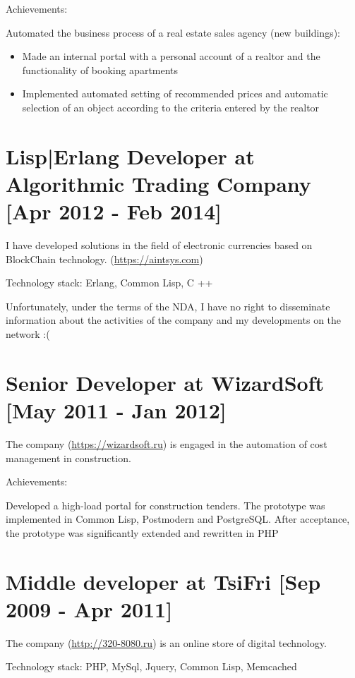 \documentclass[11pt]{article}
\begin{document}
Achievements:

Automated the business process of a real estate sales agency
(new buildings):
\begin{itemize}
\item Made an internal portal with a personal account of a
realtor and the functionality of booking apartments
\item Implemented automated setting of recommended prices and
automatic selection of an object according to the criteria
entered by the realtor
\end{itemize}


\section{\textbf{Lisp|Erlang Developer} at \textbf{Algorithmic Trading Company} [Apr 2012 - Feb 2014]}
\label{sec:org5ac2e60}

I have developed solutions in the field of electronic
currencies based on BlockChain technology. (\url{https://aintsys.com})

Technology stack: Erlang, Common Lisp, C ++

Unfortunately, under the terms of the NDA, I have no right
to disseminate information about the activities of the
company and my developments on the network :(

\section{\textbf{Senior Developer} at \textbf{WizardSoft} [May 2011 - Jan 2012]}
\label{sec:org9d2619b}

The company (\url{https://wizardsoft.ru}) is engaged in the
automation of cost management in construction.

Achievements:

Developed a high-load portal for construction tenders. The
prototype was implemented in Common Lisp, Postmodern and
PostgreSQL. After acceptance, the prototype was
significantly extended and rewritten in PHP

\section{\textbf{Middle developer} at \textbf{TsiFri} [Sep 2009 - Apr 2011]}
\label{sec:org8b8263b}

The company (\url{http://320-8080.ru}) is an online store of
digital technology.

Technology stack: PHP, MySql, Jquery, Common Lisp, Memcached
\end{document}
